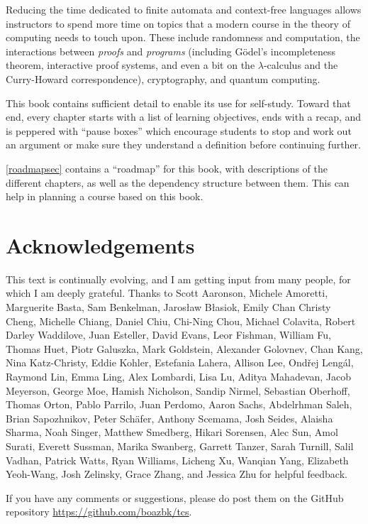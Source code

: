 Reducing the time dedicated to finite automata and context-free
languages allows instructors to spend more time on topics that a modern
course in the theory of computing needs to touch upon. These include
randomness and computation, the interactions between \emph{proofs} and
\emph{programs} (including Gödel's incompleteness theorem, interactive
proof systems, and even a bit on the \(\lambda\)-calculus and the
Curry-Howard correspondence), cryptography, and quantum computing.

This book contains sufficient detail to enable its use for self-study.
Toward that end, every chapter starts with a list of learning
objectives, ends with a recap, and is peppered with ``pause boxes''
which encourage students to stop and work out an argument or make sure
they understand a definition before continuing further.

\cref{roadmapsec} contains a ``roadmap'' for this book, with
descriptions of the different chapters, as well as the dependency
structure between them. This can help in planning a course based on this
book.

\section{Acknowledgements}\label{Acknowledgements}

This text is continually evolving, and I am getting input from many
people, for which I am deeply grateful. Thanks to Scott Aaronson,
Michele Amoretti, Marguerite Basta, Sam Benkelman, Jarosław Błasiok,
Emily Chan Christy Cheng, Michelle Chiang, Daniel Chiu, Chi-Ning Chou,
Michael Colavita, Robert Darley Waddilove, Juan Esteller, David Evans,
Leor Fishman, William Fu, Thomas Huet, Piotr Galuszka, Mark Goldstein,
Alexander Golovnev, Chan Kang, Nina Katz-Christy, Eddie Kohler,
Estefania Lahera, Allison Lee, Ondřej Lengál, Raymond Lin, Emma Ling,
Alex Lombardi, Lisa Lu, Aditya Mahadevan, Jacob Meyerson, George Moe,
Hamish Nicholson, Sandip Nirmel, Sebastian Oberhoff, Thomas Orton, Pablo
Parrilo, Juan Perdomo, Aaron Sachs, Abdelrhman Saleh, Brian Sapozhnikov,
Peter Schäfer, Anthony Scemama, Josh Seides, Alaisha Sharma, Noah
Singer, Matthew Smedberg, Hikari Sorensen, Alec Sun, Amol Surati,
Everett Sussman, Marika Swanberg, Garrett Tanzer, Sarah Turnill, Salil
Vadhan, Patrick Watts, Ryan Williams, Licheng Xu, Wanqian Yang,
Elizabeth Yeoh-Wang, Josh Zelinsky, Grace Zhang, and Jessica Zhu for
helpful feedback.

If you have any comments or suggestions, please do post them on the
GitHub repository \url{https://github.com/boazbk/tcs}.

